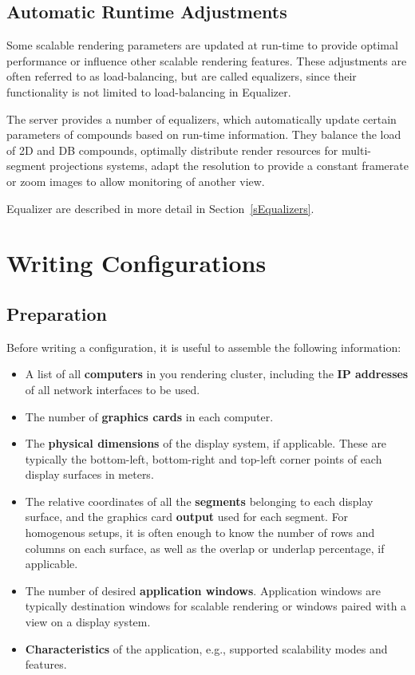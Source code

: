\documentclass[10pt,a4]{scrartcl}
\newcommand{\sref}[1]{Section~\ref{#1}}
\begin{document}
\subsection{\label{sLoadBalancing}Automatic Runtime Adjustments}

Some scalable rendering parameters are updated at run-time to provide
optimal performance or influence other scalable rendering
features. These adjustments are often referred to as load-balancing, but
are called \textsf{equalizers}, since their functionality is not limited
to load-balancing in Equalizer.

The server provides a number of equalizers, which automatically update
certain parameters of compounds based on run-time information. They
balance the load of 2D and DB compounds, optimally distribute render
resources for multi-segment projections systems, adapt the resolution to
provide a constant framerate or zoom images to allow monitoring of
another view.

Equalizer are described in more detail in \sref{sEqualizers}.


\section{\label{sConfig}Writing Configurations}

\subsection{Preparation}

Before writing a configuration, it is useful to assemble the following
information:

\begin{itemize}
\item A list of all \textbf{computers} in you rendering cluster,
  including the \textbf{IP addresses} of all network interfaces to be
  used.
\item The number of \textbf{graphics cards} in each computer.
\item The \textbf{physical dimensions} of the display system, if
  applicable. These are typically the bottom-left, bottom-right and
  top-left corner points of each display surfaces in meters.
\item The relative coordinates of all the \textbf{segments} belonging to
  each display surface, and the graphics card \textbf{output} used for
  each segment. For homogenous setups, it is often enough to know the
  number of rows and columns on each surface, as well as the overlap or
  underlap percentage, if applicable.
\item The number of desired \textbf{application windows}. Application
  windows are typically destination windows for scalable rendering or
  windows paired with a view on a display system.
\item \textbf{Characteristics} of the application, e.g., supported
  scalability modes and features.
\end{itemize}
\end{document}
